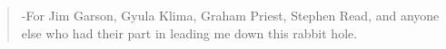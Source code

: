 \vspace*{\fill}\begin{quote}
-For Jim Garson, Gyula Klima, Graham Priest, Stephen Read, and anyone else who had their part in leading me down this rabbit hole.
\end{quote}
\vspace*{\fill}
